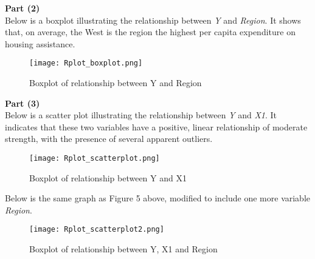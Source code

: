 \documentclass[12pt,letterpaper]{article}
\begin{document}
\noindent \textbf{Part (2)}\\

Below is a boxplot illustrating the relationship between \emph{Y} and \emph{Region}. It shows that, on average, the West is the region the highest per capita expenditure on housing assistance.\\

\begin{figure}[H]\centering
	\caption{\footnotesize Boxplot of relationship between Y and Region}
	\texttt{[image: Rplot\_boxplot.png]}
\end{figure} 

\noindent \textbf{Part (3)}\\

Below is a scatter plot illustrating the relationship between \emph{Y} and \emph{X1}. It indicates that these two variables have a positive, linear relationship of moderate strength, with the presence of several apparent outliers.

\begin{figure}[H]\centering
	\caption{\footnotesize Boxplot of relationship between Y and X1}
	\texttt{[image: Rplot\_scatterplot.png]}
\end{figure} 

Below is the same graph as Figure 5 above, modified to include one more variable \emph{Region}.

\begin{figure}[H]\centering
	\caption{\footnotesize Boxplot of relationship between Y, X1 and Region}
	\texttt{[image: Rplot\_scatterplot2.png]}
\end{figure} 
\end{document}
